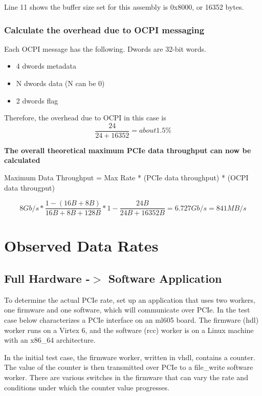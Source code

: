    Line 11 shows the buffer size set for this assembly is 0x8000, or 16352 bytes.

\subsubsection{Calculate the overhead due to OCPI messaging}

Each OCPI message has the following.  Dwords are 32-bit words.
\begin{itemize}

\item{4 dwords metadata}
\item{N dwords data (N can be 0)}
\item{2 dwords flag}

\end{itemize}

Therefore, the overhead due to OCPI in this case is 
\[\frac{24}{24+16352} = about 1.5\%\]


\textbf{The overall theoretical maximum PCIe data throughput can now be calculated}

Maximum Data Throughput = Max Rate * (PCIe data throughput) * (OCPI data througput)

\[8Gb/s * \frac{1 - (16B + 8B)}{16B + 8B + 128B} * 1 - \frac{24B}{24B+16352B} = 6.727Gb/s = 841MB/s\]

\section{Observed Data Rates}

\subsection{Full Hardware -$>$ Software Application}

To determine the actual PCIe rate, set up an application that uses two workers, one firmware and one software, which will communicate over PCIe.  In the test case below characterizes a PCIe interface on an ml605 board.  The firmware (hdl) worker runs on a Virtex 6, and the software (rcc) worker is on a Linux machine with an x86\_64 architecture.

In the initial test case, the firmware worker, written in vhdl, contains a counter.  The value of the counter is then transmitted over PCIe to a file\_write software worker.  There are various switches in the firmware that can vary the rate and conditions under which the counter value progresses.  

